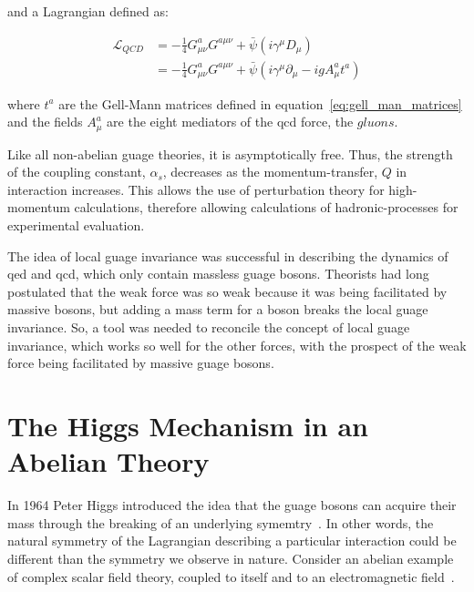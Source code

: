 \noindent and a Lagrangian defined as:

\begin{equation}\label{eq:qcd_lagrangian}
\begin{aligned}
\mathcal{L}_{QCD} & = -\frac{1}{4}G_{\mu\nu}^{a}G^{a\mu\nu} +
\bar{\psi}(i\gamma^{\mu}D_{\mu}) \\
 & = -\frac{1}{4}G_{\mu\nu}^{a}G^{a\mu\nu} +
\bar{\psi}(i\gamma^{\mu}\partial_{\mu}-igA_{\mu}^{a}t^{a})
\end{aligned}
\end{equation}

\noindent where $t^{a}$ are the Gell-Mann matrices defined in
equation~\ref{eq:gell_man_matrices} and the fields $A_{\mu}^{a}$ are
the eight mediators of the \acrshort{qcd} force, the $gluons$.  

\par Like all non-abelian guage theories, it is asymptotically
free.  Thus, the strength of the coupling constant,
$\alpha_{s}$, decreases as the momentum-transfer, $Q$ in interaction
increases.  This allows the use of perturbation theory for
high-momentum calculations, therefore allowing calculations of
hadronic-processes for experimental evaluation.    

\par The idea of local guage invariance was successful in describing
the dynamics of \acrshort{qed} and \acrshort{qcd}, which only contain
massless guage bosons. Theorists had long postulated that
the weak force was so weak because it was being facilitated by massive
bosons, but adding a mass term for a boson breaks the local guage
invariance.  So, a tool was needed to reconcile the concept of local guage
invariance, which works so well for the other forces, with the
prospect of the weak force being facilitated by massive guage bosons.


\section{The Higgs Mechanism in an Abelian Theory}
\label{abelian_higgs_mechanism_overview}

\par In 1964 Peter Higgs introduced the idea that the guage bosons
can acquire their mass through the breaking of an underlying
symemtry~\cite{th:Higgs_BrokenSymmetries}. In other words, the natural
symmetry of the Lagrangian describing a particular interaction could
be different than the symmetry we observe in nature.  Consider an
abelian example of complex scalar field theory, coupled to itself and
to an electromagnetic field~\cite{Peskin_Schroeder}. 

